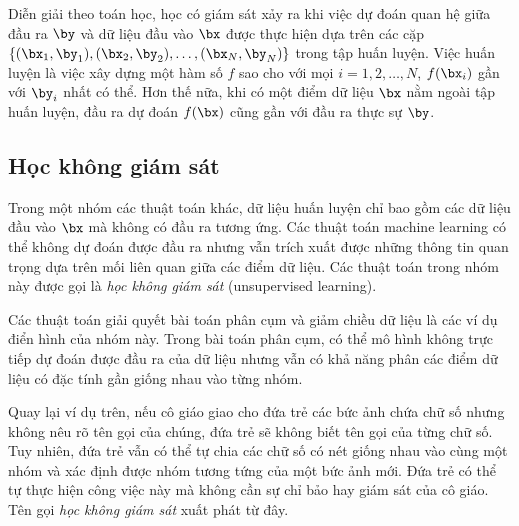 Diễn giải theo toán học, học có giám sát xảy ra khi việc dự đoán quan hệ giữa
đầu ra $\by$ và dữ liệu đầu vào $\bx$ được thực hiện dựa trên các cặp $\{(\bx_1,
\by_1), (\bx_2, \by_2), \dots, (\bx_N, \by_N)\}$ trong tập huấn luyện. Việc huấn
luyện là việc xây dựng một hàm số $f$ sao cho với mọi $i = 1, 2, \dots, N$,
$f(\bx_i)$ gần với $\by_i$ nhất có thể. Hơn thế nữa, khi có một điểm dữ liệu
$\bx$ nằm ngoài tập huấn luyện, đầu ra dự đoán $f(\bx)$ cũng gần với đầu ra
thực sự $\by$.



\subsection{Học không giám sát}
Trong một nhóm các thuật toán khác, dữ liệu huấn luyện chỉ bao gồm các dữ liệu đầu vào $\bx$ mà không có đầu ra tương ứng. Các thuật toán machine learning có thể không dự đoán được đầu ra nhưng vẫn trích xuất được những thông tin quan trọng dựa trên mối liên quan giữa các điểm dữ liệu. Các thuật toán trong nhóm này được gọi là \textit{học không giám sát} (unsupervised learning). 

Các thuật toán giải quyết bài toán phân cụm và giảm chiều dữ liệu là các ví dụ
điển hình của nhóm này. Trong bài toán phân cụm, có thể mô hình không trực tiếp
dự đoán được đầu ra của dữ liệu nhưng vẫn có khả năng phân các điểm dữ liệu có
đặc tính gần giống nhau vào từng nhóm.

Quay lại ví dụ trên, nếu cô giáo giao cho đứa trẻ các bức ảnh chứa chữ số nhưng không nêu rõ tên gọi của chúng, đứa trẻ sẽ không biết tên gọi của từng chữ số. Tuy nhiên, đứa trẻ vẫn có thể tự chia các chữ số có nét giống nhau vào cùng một nhóm và xác định được nhóm tương tứng của một bức ảnh mới. Đứa trẻ có thể tự thực hiện công việc này mà không cần sự chỉ bảo hay giám sát của cô giáo. Tên gọi \textit{học không giám sát} xuất phát từ đây. 



